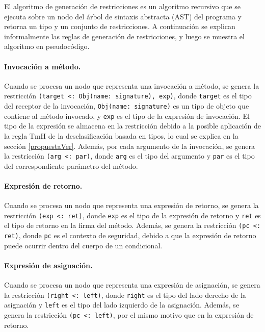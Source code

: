 El algoritmo de generación de restricciones es un algoritmo recursivo que se ejecuta sobre un nodo del árbol de sintaxis abstracta (AST) del programa y retorna un tipo y un conjunto de restricciones. A continuación se explican informalmente las reglas de generación de restricciones, y luego se muestra el algoritmo en pseudocódigo.

\paragraph{Invocación a método.}Cuando se procesa un nodo que representa una invocación a método, se genera la restricción \texttt{(target <: Obj(name: signature), exp)}, donde \texttt{target} es el tipo del receptor de la invocación, \texttt{Obj(name: signature)} es un tipo de objeto que contiene al método invocado, y \texttt{exp} es el tipo de la expresión de invocación. El tipo de la expresión se almacena en la restricción debido a la posible aplicación de la regla $\text{TmH}$ de la desclasificación basada en tipos, lo cual se explica en la sección \ref{propuestaVer}. Además, por cada argumento de la invocación, se genera la restricción \texttt{(arg <: par)}, donde \texttt{arg} es el tipo del argumento y \texttt{par} es el tipo del correspondiente parámetro del método.

\paragraph{Expresión de retorno.}Cuando se procesa un nodo que representa una expresión de retorno, se genera la restricción \texttt{(exp <: ret)}, donde \texttt{exp} es el tipo de la expresión de retorno y \texttt{ret} es el tipo de retorno en la firma del método. Además, se genera la restricción \texttt{(pc <: ret)}, donde \texttt{pc} es el contexto de seguridad, debido a que la expresión de retorno puede ocurrir dentro del cuerpo de un condicional.

\paragraph{Expresión de asignación.}Cuando se procesa un nodo que representa una expresión de asignación, se genera la restricción \texttt{(right <: left)}, donde \texttt{right} es el tipo del lado derecho de la asignación y \texttt{left} es el tipo del lado izquierdo de la asignación. Además, se genera la restricción \texttt{(pc <: left)}, por el mismo motivo que en la expresión de retorno.

